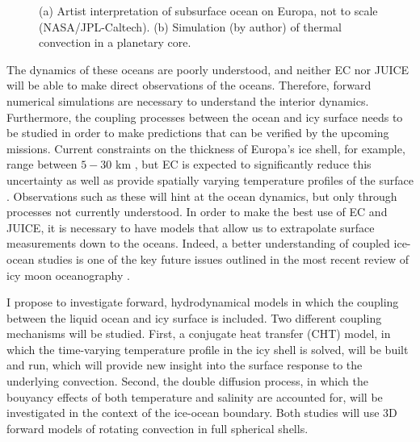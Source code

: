\documentclass{article}
\begin{document}
\begin{figure}
	\begin{center}
		\quad
	\end{center}
	\caption{(a) Artist interpretation of subsurface ocean on Europa, not to scale (NASA/JPL-Caltech). (b) Simulation (by author) of thermal convection in a planetary core\citep{tO25}.}
	\label{f:pic}
\end{figure}
The dynamics of these oceans are poorly understood, and neither EC nor JUICE will be able to make direct observations of the oceans. 
Therefore, forward numerical simulations are necessary to understand the interior dynamics. 
Furthermore, the coupling processes between the ocean and icy surface needs to be studied in order to make predictions that can be verified by the upcoming missions.
Current constraints on the thickness of Europa's ice shell, for example, range between $5-30$ km \citep{sV18}, but EC is expected to significantly reduce this uncertainty as well as provide spatially varying temperature profiles of the surface \citep{kS20}. 
Observations such as these will hint at the ocean dynamics, but only through processes not currently understood. In order to make the best use of EC and JUICE, it is necessary to have models that allow us to extrapolate surface measurements down to the oceans.
Indeed, a better understanding of coupled ice-ocean studies is one of the key future issues outlined in the most recent review of icy moon oceanography \citep{kS24}. 

I propose to  investigate forward, hydrodynamical models in which the coupling between the liquid ocean and icy surface is included. Two different coupling mechanisms will be studied. 
First, a conjugate heat transfer (CHT) model, in which the time-varying temperature profile in the icy shell is solved, will be built and run, which will provide new insight into the surface response to the underlying convection. Second, the double diffusion process, in which the bouyancy effects of both temperature and salinity are accounted for, will be investigated in the context of the ice-ocean boundary. Both studies will use 3D forward models of rotating convection in full spherical shells. 
\end{document}
